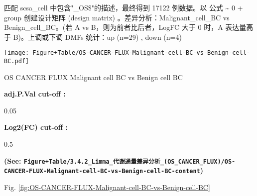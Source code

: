 \documentclass[
]{article}
\begin{document}
匹配 scsa\_cell 中包含"\_OS\$"的描述，最终得到 17122 例数据。以 公式 \textasciitilde{} 0 + group 创建设计矩阵 (design matrix) 。差异分析：Malignant\_cell\_BC vs Benign\_cell\_BC。(若 A vs B，则为前者比后者，LogFC 大于 0 时，A 表达量高于 B)。上调或下调 DMFs 统计：up (n=29) , down (n=4)

\begin{center}\vspace{1.5cm}\end{center}
\def\@captype{figure}
\begin{center}
\texttt{[image: Figure+Table/OS-CANCER-FLUX-Malignant-cell-BC-vs-Benign-cell-BC.pdf]}
\caption{OS CANCER FLUX Malignant cell BC vs Benign cell BC}\label{fig:OS-CANCER-FLUX-Malignant-cell-BC-vs-Benign-cell-BC}
\end{center}

\begin{center}\vspace{1.5cm}\end{center}\begin{center}\begin{tcolorbox}[colback=gray!10, colframe=gray!50, width=0.9\linewidth, arc=1mm, boxrule=0.5pt]
\textbf{
adj.P.Val cut-off
:}

\vspace{0.5em}

    0.05

\vspace{2em}


\textbf{
Log2(FC) cut-off
:}

\vspace{0.5em}

    0.5

\vspace{2em}
\end{tcolorbox}
\end{center}

\textbf{(See: \texttt{Figure+Table/3.4.2\_Limma\_代谢通量差异分析\_(OS\_CANCER\_FLUX)/OS-CANCER-FLUX-Malignant-cell-BC-vs-Benign-cell-BC-content})}

Fig. \ref{fig:OS-CANCER-FLUX-Malignant-cell-BC-vs-Benign-cell-BC}

\begin{center}\vspace{1.5cm}\end{center}
\end{document}
